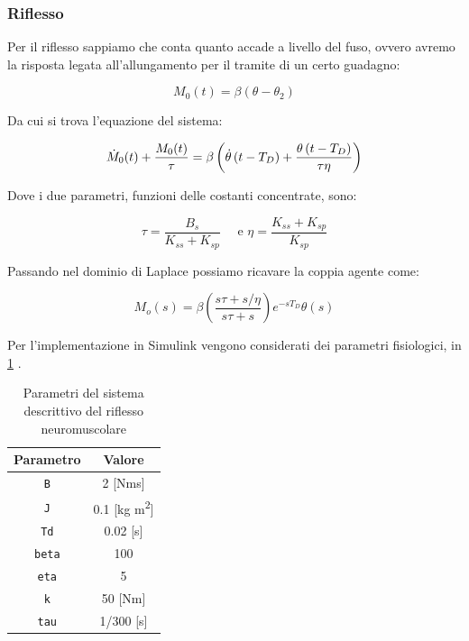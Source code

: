 \subsubsection{Riflesso}

Per il riflesso sappiamo che conta quanto accade a livello del fuso, ovvero avremo la risposta legata all'allungamento per il tramite di un certo guadagno:

\begin{equation}
	M_{0}(t)=\beta\left(\theta-\theta_{2}\right)
\end{equation}

Da cui si trova l'equazione del sistema:

\begin{equation}
	\small{\dot{M}_{0}(t)+\frac{M_{0}(t)}{\tau}=\beta\left(\dot{\theta}\left(t-T_{D}\right)+\frac{\theta\left(t-T_{D}\right)}{\tau \eta}\right)}
\end{equation}

Dove i due parametri, funzioni delle costanti concentrate, sono:

\begin{equation}
	\tau=\frac{B_{s}}{K_{s s}+K_{s p}} \quad \text { e } \eta=\frac{K_{s s}+K_{s p}}{K_{s p}}
\end{equation}

Passando nel dominio di Laplace possiamo ricavare la coppia agente come:

\begin{equation}
	M_{o}(s)=\beta\left(\frac{s \tau+s / \eta}{s \tau+s}\right) e^{-s T_{D}} \theta(s)
\end{equation}

Per l'implementazione in Simulink vengono considerati dei parametri fisiologici, in \cref{tab:parametriMuscolo} \cite{khoo_physiological_2018,soechting_evaluation_1971}. 

\begin{table}[t!]
	\centering
	\begin{tabular}{|c|c|}
		\hline
		Parametro & Valore \\
		\hline
		\texttt{B} & 2 [Nms] \\
		\hline
		\texttt{J} & 0.1 [kg m\textsuperscript{2}] \\
		\hline
		\texttt{Td} & 0.02 [s] \\
		\hline
		\texttt{beta} & 100 \\
		\hline
		\texttt{eta} & 5 \\
		\hline
		\texttt{k} & 50 [Nm] \\
		\hline
		\texttt{tau} & 1/300 [s] \\
		\hline
	\end{tabular}
	\caption{Parametri del sistema descrittivo del riflesso neuromuscolare}
	\label{tab:parametriMuscolo}
\end{table}


